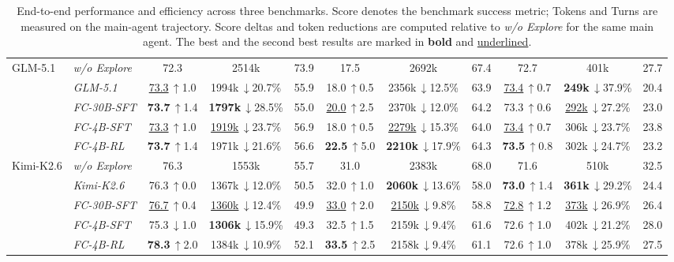 \documentclass{llmxive}
\providecommand{\toksave}[1]{\,{\scriptsize$\downarrow$#1\%}}
\providecommand{\scoregain}[1]{\,{\scriptsize$\uparrow$#1}}
\providecommand{\scoreloss}[1]{\,{\scriptsize$\downarrow$#1}}
\begin{document}
\begin{table}[t]
{\begin{tabular}{ll ccc ccc ccc}
\midrule
\multirow{5}{*}{GLM-5.1}
 & \textit{w/o Explore}          & 72.3 & 2514k & 73.9 & 17.5 & 2692k & 67.4 & 72.7 & 401k & 27.7 \\
 & \textit{GLM-5.1}      & \underline{73.3}\scoregain{1.0} & 1994k\toksave{20.7} & 55.9 & 18.0\scoregain{0.5} & 2356k\toksave{12.5} & 63.9 & \underline{73.4}\scoregain{0.7} & \textbf{249k}\toksave{37.9} & 20.4 \\
 & \textit{FC-30B-SFT}  & \textbf{73.7}\scoregain{1.4} & \textbf{1797k}\toksave{28.5} & 55.0 & \underline{20.0}\scoregain{2.5} & 2370k\toksave{12.0} & 64.2 & 73.3\scoregain{0.6} & \underline{292k}\toksave{27.2} & 23.0 \\
 & \textit{FC-4B-SFT}   & \underline{73.3}\scoregain{1.0} & \underline{1919k}\toksave{23.7} & 56.9 & 18.0\scoregain{0.5} & \underline{2279k}\toksave{15.3} & 64.0 & \underline{73.4}\scoregain{0.7} & 306k\toksave{23.7} & 23.8 \\
 & \textit{FC-4B-RL}    & \textbf{73.7}\scoregain{1.4} & 1971k\toksave{21.6} & 56.6 & \textbf{22.5}\scoregain{5.0} & \textbf{2210k}\toksave{17.9} & 64.3 & \textbf{73.5}\scoregain{0.8} & 302k\toksave{24.7} & 23.2 \\
\midrule
\multirow{5}{*}{Kimi-K2.6}
 & \textit{w/o Explore}          & 76.3 & 1553k & 55.7 & 31.0 & 2383k & 68.0 & 71.6 & 510k & 32.5 \\
 & \textit{Kimi-K2.6}      & 76.3\scoregain{0.0} & 1367k\toksave{12.0} & 50.5 & 32.0\scoregain{1.0} & \textbf{2060k}\toksave{13.6} & 58.0 & \textbf{73.0}\scoregain{1.4} & \textbf{361k}\toksave{29.2} & 24.4 \\
 & \textit{FC-30B-SFT}  & \underline{76.7}\scoregain{0.4} & \underline{1360k}\toksave{12.4} & 49.9 & \underline{33.0}\scoregain{2.0} & \underline{2150k}\toksave{9.8} & 58.8 & \underline{72.8}\scoregain{1.2} & \underline{373k}\toksave{26.9} & 26.4 \\
 & \textit{FC-4B-SFT}   & 75.3\scoreloss{1.0} & \textbf{1306k}\toksave{15.9} & 49.3 & 32.5\scoregain{1.5} & 2159k\toksave{9.4} & 61.6 & 72.6\scoregain{1.0} & 402k\toksave{21.2} & 28.0 \\
 & \textit{FC-4B-RL}    & \textbf{78.3}\scoregain{2.0} & 1384k\toksave{10.9} & 52.1 & \textbf{33.5}\scoregain{2.5} & 2158k\toksave{9.4} & 61.1 & 72.6\scoregain{1.0} & 378k\toksave{25.9} & 27.5 \\
\bottomrule
\end{tabular}%
}
\vspace{-5mm}
\caption{End-to-end performance and efficiency across three benchmarks. Score denotes the benchmark success metric; Tokens and Turns are measured on the main-agent trajectory. Score deltas and token reductions are computed relative to \textit{w/o Explore} for the same main agent. The best and the second best results are marked in \textbf{bold} and \underline{underlined}.}
\label{tab:e2e_main}
\end{table}
\end{document}
